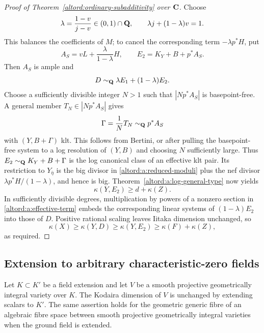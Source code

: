 \begin{proof}[Proof of Theorem~\ref{altord:ordinary-subadditivity} over \(\mathbf C\)]
Choose
\[
 \lambda=\frac{1-v}{j-v}\in(0,1)\cap\mathbf Q,
 \qquad \lambda j+(1-\lambda)v=1.
\]
This balances the coefficients of \(M\); to cancel the corresponding
term \(-\lambda p^*H\), put
\[
 A_S=vL+\frac{\lambda}{1-\lambda}H,\qquad
 E_2=K_Y+B+p^*A_S.
\]
Then \(A_S\) is ample and
\begin{equation}\label{altord:a:interpolation}
 D\sim_{\mathbf Q}\lambda E_1+(1-\lambda)E_2.
\end{equation}
Choose a sufficiently divisible integer \(N>1\) such that
\(|Np^*A_S|\) is basepoint-free.  A general member
\(T_N\in|Np^*A_S|\) gives
\[
 \Gamma=\frac{1}{N}T_N\sim_{\mathbf Q}p^*A_S
\]
with \((Y,B+\Gamma)\) klt.  This follows from Bertini, or after
pulling the basepoint-free system to a log resolution of
\((Y,B)\) and choosing \(N\) sufficiently large.
Thus \(E_2\sim_{\mathbf Q}K_Y+B+\Gamma\) is the log canonical class of
an effective klt pair.  Its restriction to \(Y_{\bar\eta}\) is
the big divisor in \eqref{altord:a:reduced-moduli} plus the nef divisor
\(\lambda p^*H/(1-\lambda)\), and hence is big.
Theorem~\ref{altord:a:log-general-type} now yields
\[
 \kappa(Y,E_2)\geq d+\kappa(Z).
\]
In sufficiently divisible degrees, multiplication by powers of a
nonzero section in \eqref{altord:a:effective-term} embeds the corresponding
linear systems of \((1-\lambda)E_2\) into those of \(D\).
Positive rational scaling leaves Iitaka dimension unchanged, so
\[
 \kappa(X)\geq\kappa(Y,D)\geq\kappa(Y,E_2)
        \geq\kappa(F)+\kappa(Z),
\]
as required.
\end{proof}

\subsection{Extension to arbitrary characteristic-zero fields}

\begin{lemma}\label{altord:a:field-extension}
Let \(K\subset K'\) be a field extension and let \(V\) be a smooth
projective geometrically integral variety over \(K\).
The Kodaira dimension of \(V\) is unchanged by extending scalars
to \(K'\).  The same assertion holds for the geometric generic
fibre of an algebraic fibre space between smooth projective geometrically integral
varieties when the ground field is extended.
\end{lemma}

